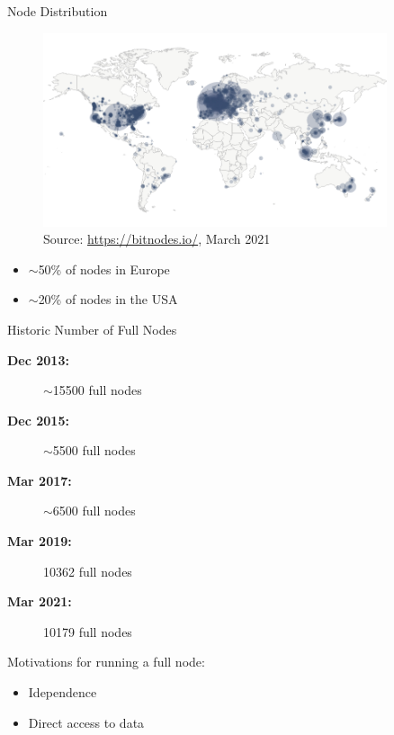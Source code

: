 \documentclass[handout]{beamer}
\begin{document}
\begin{frame}{Node Distribution}
	\begin{figure}[t]
		\includegraphics[width = 0.9\textwidth]{../assets/images/node_distribution}
		Source: \link \url{https://bitnodes.io/}, March 2021
	\end{figure}

	\begin{footnotesize}
		\begin{itemize}
			\item $\sim$50\% of nodes in Europe
			\item $\sim$20\% of nodes in the USA
		\end{itemize}
	\end{footnotesize}
	
\end{frame}

\begin{frame}{Historic Number of Full Nodes}
	\begin{description}
		\item[\textbf{Dec 2013:}] $\sim$15500 full nodes
		\item[\textbf{Dec 2015:}] $\sim$5500 full nodes
		\item[\textbf{Mar 2017:}] $\sim$6500 full nodes
		\item[\textbf{Mar 2019:}] 10362 full nodes
		\item[\textbf{Mar 2021:}] 10179 full nodes
	\end{description}	
		
	\vspace{1 cm}
	
	Motivations for running a full node:
	\begin{itemize}
		\item Idependence
		\item Direct access to data
	\end{itemize}
	
\end{frame}
\end{document}
